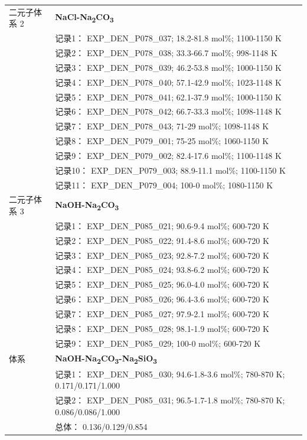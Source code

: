 \documentclass[12pt]{article}
\begin{document}
{\begin{longtable}[]{@{}
  >{\raggedright\arraybackslash}p{}
  >{\raggedright\arraybackslash}p{}@{}}
二元子体系 2  & \textbf{NaCl-Na\textsubscript{2}CO\textsubscript{3}} \\
 & 记录1： EXP\_DEN\_P078\_037; 18.2-81.8 mol\%; 1100-1150 K \\
 & 记录2： EXP\_DEN\_P078\_038; 33.3-66.7 mol\%; 998-1148 K \\
 & 记录3： EXP\_DEN\_P078\_039; 46.2-53.8 mol\%; 1000-1150 K \\
 & 记录4： EXP\_DEN\_P078\_040; 57.1-42.9 mol\%; 1023-1148 K \\
 & 记录5： EXP\_DEN\_P078\_041; 62.1-37.9 mol\%; 1000-1150 K \\
 & 记录6： EXP\_DEN\_P078\_042; 66.7-33.3 mol\%; 1098-1148 K \\
 & 记录7： EXP\_DEN\_P078\_043; 71-29 mol\%; 1098-1148 K \\
 & 记录8： EXP\_DEN\_P079\_001; 75-25 mol\%; 1060-1150 K \\
 & 记录9： EXP\_DEN\_P079\_002; 82.4-17.6 mol\%; 1100-1148 K \\
 & 记录10： EXP\_DEN\_P079\_003; 88.9-11.1 mol\%; 1100-1150 K \\
 & 记录11： EXP\_DEN\_P079\_004; 100-0 mol\%; 1080-1150 K  \\

二元子体系 3  & \textbf{NaOH-Na\textsubscript{2}CO\textsubscript{3}} \\
 & 记录1： EXP\_DEN\_P085\_021; 90.6-9.4 mol\%; 600-720 K \\
 & 记录2： EXP\_DEN\_P085\_022; 91.4-8.6 mol\%; 600-720 K \\
 & 记录3： EXP\_DEN\_P085\_023; 92.8-7.2 mol\%; 600-720 K \\
 & 记录4： EXP\_DEN\_P085\_024; 93.8-6.2 mol\%; 600-720 K \\
 & 记录5： EXP\_DEN\_P085\_025; 96.0-4.0 mol\%; 600-720 K \\
 & 记录6： EXP\_DEN\_P085\_026; 96.4-3.6 mol\%; 600-720 K \\
 & 记录7： EXP\_DEN\_P085\_027; 97.9-2.1 mol\%; 600-720 K \\
 & 记录8： EXP\_DEN\_P085\_028; 98.1-1.9 mol\%; 600-720 K \\
 & 记录9： EXP\_DEN\_P085\_029; 100-0 mol\%; 600-720 K  \\

\midrule
体系 & \textbf{NaOH-Na\textsubscript{2}CO\textsubscript{3}-Na\textsubscript{2}SiO\textsubscript{3}} \\
 & 记录1： EXP\_DEN\_P085\_030; 94.6-1.8-3.6 mol\%; 780-870 K; 0.171/0.171/1.000 \\
 & 记录2： EXP\_DEN\_P085\_031; 96.5-1.7-1.8 mol\%; 780-870 K; 0.086/0.086/1.000 \\
 & 总体： 0.136/0.129/0.854  \\


\end{longtable}}
\end{document}
